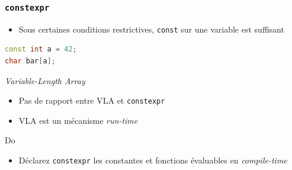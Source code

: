 \documentclass[C++.tex]{subfiles}
\begin{document}
\begin{frame}[fragile]
	\frametitle{\lstinline|constexpr|}
	\begin{itemize}
		\item Sous certaines conditions restrictives, \lstinline|const| sur une variable est suffisant

	\end{itemize}

	\begin{lstlisting}[language=C++]
const int a = 42;
char bar[a];\end{lstlisting}

	\begin{alertblock}{\textit{Variable-Length Array}}
		\begin{itemize}
			\item Pas de rapport entre VLA et \lstinline|constexpr|
			\item VLA est un mécanisme \textit{run-time}
		\end{itemize}
	\end{alertblock}


	\begin{exampleblock}{Do}
		\begin{itemize}
			\item Déclarez \lstinline|constexpr| les constantes et fonctions évaluables en \textit{compile-time}
		\end{itemize}
	\end{exampleblock}
\end{frame}
\end{document}
